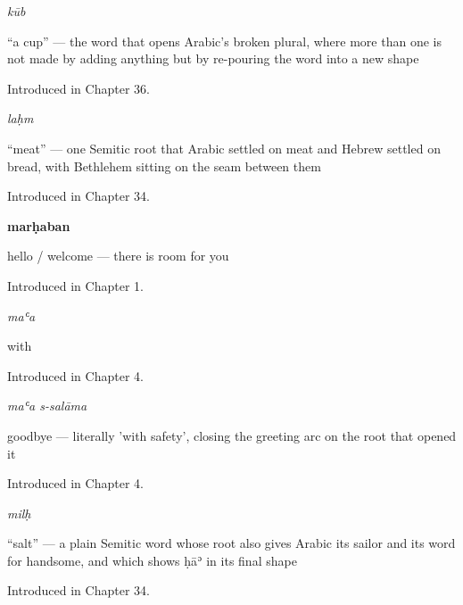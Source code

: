 \noindent\begin{minipage}[t]{\linewidth}
\raggedright
\textbf{}\enspace\emph{kūb}\par
\small \textquotedblleft{}a cup\textquotedblright{} — the word that opens Arabic's broken plural, where more than one is not made by adding anything but by re-pouring the word into a new shape\par
\footnotesize Introduced in Chapter 36.
\end{minipage}\par\medskip

\noindent\begin{minipage}[t]{\linewidth}
\raggedright
\textbf{}\enspace\emph{laḥm}\par
\small \textquotedblleft{}meat\textquotedblright{} — one Semitic root that Arabic settled on meat and Hebrew settled on bread, with Bethlehem sitting on the seam between them\par
\footnotesize Introduced in Chapter 34.
\end{minipage}\par\medskip

\noindent\begin{minipage}[t]{\linewidth}
\raggedright
\textbf{marḥaban}\par
\small hello / welcome — there is room for you\par
\footnotesize Introduced in Chapter 1.
\end{minipage}\par\medskip

\noindent\begin{minipage}[t]{\linewidth}
\raggedright
\textbf{}\enspace\emph{maʿa}\par
\small with\par
\footnotesize Introduced in Chapter 4.
\end{minipage}\par\medskip

\noindent\begin{minipage}[t]{\linewidth}
\raggedright
\textbf{ }\enspace\emph{maʿa s-salāma}\par
\small goodbye — literally 'with safety', closing the greeting arc on the root that opened it\par
\footnotesize Introduced in Chapter 4.
\end{minipage}\par\medskip

\noindent\begin{minipage}[t]{\linewidth}
\raggedright
\textbf{}\enspace\emph{milḥ}\par
\small \textquotedblleft{}salt\textquotedblright{} — a plain Semitic word whose root also gives Arabic its sailor and its word for handsome, and which shows ḥāʾ in its final shape\par
\footnotesize Introduced in Chapter 34.
\end{minipage}\par\medskip

